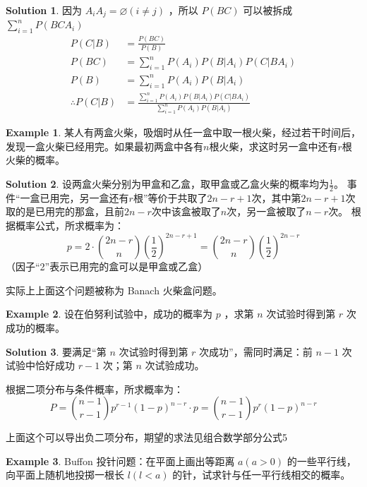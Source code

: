 \documentclass[oneside]{book}
\theoremstyle{definition}
\newtheorem{example}{Example}[section]
\newtheorem*{sol}{Solution}
\begin{document}
	\begin{sol}
		因为 \( A_iA_j=\varnothing(i\neq j) \) ，所以 \(P(BC)\) 可以被拆成 \(\sum_{i=1}^nP(BCA_i) \)
		\[
		\begin{aligned}
			P(C|B) &= \frac{P(BC)}{P(B)} \\
			P(BC) &= \sum_{i=1}^n P(A_i)P(B|A_i)P(C|BA_i) \\
			P(B) &= \sum_{i=1}^n P(A_i)P(B|A_i) \\
			\therefore P(C|B) &= \frac{\sum_{i=1}^n P(A_i)P(B|A_i)P(C|BA_i)}{\sum_{i=1}^n P(A_i)P(B|A_i)}
		\end{aligned}
		\]
	\end{sol}
	\begin{example}
		某人有两盒火柴，吸烟时从任一盒中取一根火柴，经过若干时间后，发现一盒火柴已经用完。如果最初两盒中各有\( n \)根火柴，求这时另一盒中还有\( r \)根火柴的概率。
	\end{example}
	
	\begin{sol}
		设两盒火柴分别为甲盒和乙盒，取甲盒或乙盒火柴的概率均为\( \frac{1}{2} \)。
		事件“一盒已用完，另一盒还有\( r \)根”等价于共取了\( 2n - r + 1 \)次，其中第\( 2n - r + 1 \)次取的是已用完的那盒，且前\( 2n - r \)次中该盒被取了\( n \)次，另一盒被取了\( n - r \)次。
		根据概率公式，所求概率为：
		\[
		p = 2 \cdot \binom{2n - r}{n} \left( \frac{1}{2} \right)^{2n - r + 1} = \binom{2n - r}{n} \left( \frac{1}{2} \right)^{2n - r}
		\]
		（因子“2”表示已用完的盒可以是甲盒或乙盒）
	\end{sol}
	实际上上面这个问题被称为 Banach 火柴盒问题。
	\begin{example}
		设在伯努利试验中，成功的概率为 \( p \) ，求第 \( n \) 次试验时得到第 \( r \) 次成功的概率。
	\end{example}
	
	\begin{sol}
		要满足“第 \( n \) 次试验时得到第 \( r \) 次成功”，需同时满足：前 \( n-1 \) 次试验中恰好成功 \( r-1 \) 次；第 \( n \) 次试验成功。
		
		根据二项分布与条件概率，所求概率为：
		\[
		P = \binom{n-1}{r-1} p^{r-1} (1-p)^{n-r} \cdot p = \binom{n-1}{r-1} p^r (1-p)^{n-r}
		\]
		
		上面这个可以导出负二项分布，期望的求法见组合数学部分公式5
	\end{sol}
	\begin{example}
		Buffon 投针问题：在平面上画出等距离 \( a(a > 0) \) 的一些平行线，向平面上随机地投掷一根长 \( l(l < a) \) 的针，试求针与任一平行线相交的概率。
	\end{example}
	
\end{document}
